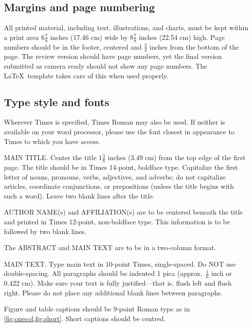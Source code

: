 \documentclass[10pt,twocolumn,letterpaper]{article}
\begin{document}
\subsection{Margins and page numbering}

All printed material, including text, illustrations, and charts, must be kept
within a print area $6\frac{7}{8}$ inches (17.46 cm) wide by $8\frac{7}{8}$ inches (22.54 cm)
high.
%
Page numbers should be in the footer, centered and $\frac{3}{4}$ inches from the bottom of the page.
The review version should have page numbers, yet the final version submitted as camera ready should not show any page numbers.
The \LaTeX\ template takes care of this when used properly.



\subsection{Type style and fonts}

Wherever Times is specified, Times Roman may also be used.
If neither is available on your word processor, please use the font closest in
appearance to Times to which you have access.

MAIN TITLE.
Center the title $1\frac{3}{8}$ inches (3.49 cm) from the top edge of the first page.
The title should be in Times 14-point, boldface type.
Capitalize the first letter of nouns, pronouns, verbs, adjectives, and adverbs;
do not capitalize articles, coordinate conjunctions, or prepositions (unless the title begins with such a word).
Leave two blank lines after the title.

AUTHOR NAME(s) and AFFILIATION(s) are to be centered beneath the title
and printed in Times 12-point, non-boldface type.
This information is to be followed by two blank lines.

The ABSTRACT and MAIN TEXT are to be in a two-column format.

MAIN TEXT.
Type main text in 10-point Times, single-spaced.
Do NOT use double-spacing.
All paragraphs should be indented 1 pica (approx.~$\frac{1}{6}$ inch or 0.422 cm).
Make sure your text is fully justified---that is, flush left and flush right.
Please do not place any additional blank lines between paragraphs.

Figure and table captions should be 9-point Roman type as in \cref{fig:onecol,fig:short}.
Short captions should be centred.
\end{document}
